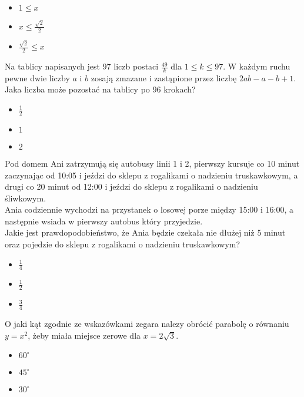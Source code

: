 \documentclass[12pt, a4paper]{article}
\newcommand{\question}[1]{\normalitem \begin{samepage}#1 \end{samepage}}
\newcommand{\cmark}{\textcolor{green}{T}}%
\newcommand{\xmark}{\textcolor{red}{N}}%
\newcommand{\yes}{\rlap{\framebox(15,15)} {\raisebox{2pt}{\large\hspace{-1pt}\cmark}}%
\hspace{3pt}}
\newcommand{\no}{\rlap{\framebox(15,15)} {\raisebox{2pt}{\large\hspace{-1pt}\xmark}}%
\hspace{3pt}}
\begin{document}
\begin{enumerate}
{		\begin{itemize}
			\item [\no]$1 \leq x$
			\item [\no]$x \leq \frac{\sqrt{2}}{2}$
			\item [\yes]$\frac{\sqrt{2}}{2} \leq x$
		\end{itemize}
	}
	
	\question {
		Na tablicy napisanych jest $97$ liczb postaci $\frac{49}{k}$ dla $1 \leq k \leq 97$. W każdym ruchu pewne dwie liczby $a$ i $b$ zosają zmazane i zastąpione przez liczbę $2ab-a-b+1$. Jaka liczba może pozostać na tablicy po $96$ krokach?
		
		\begin{itemize}
			\item [\no]$\frac{1}{2}$
			\item [\yes]$1$
			\item [\no]$2$
		\end{itemize}
	}
	
	\question {
		Pod domem Ani zatrzymują się autobusy linii 1 i 2, pierwszy kursuje co 10 minut zaczynając od 10:05 i jeździ do sklepu z rogalikami o nadzieniu truskawkowym, a drugi co 20 minut od 12:00 i jeździ do sklepu z rogalikami o nadzieniu śliwkowym. \\
		Ania codziennie wychodzi na przystanek o losowej porze między 15:00 i 16:00, a następnie wsiada w pierwszy autobus który przyjedzie. \\
		Jakie jest prawdopodobieństwo, że Ania będzie czekała nie dłużej niż 5 minut oraz pojedzie do sklepu z rogalikami o nadzieniu truskawkowym?
		
		\begin{itemize}
			\item [\no]$\frac{1}{4}$
			\item [\yes]$\frac{1}{2}$
			\item [\no]$\frac{3}{4}$
		\end{itemize}
	}
	
	\question {
		O jaki kąt zgodnie ze wskazówkami zegara nalezy obrócić parabolę o równaniu $y=x^2$, żeby miała miejsce zerowe dla $x=2 \sqrt{3}$.
		
		\begin{itemize}
			\item [\yes]$60^{\circ}$  
			\item [\no]$45^{\circ}$
			\item [\no]$30^{\circ}$
		\end{itemize}
	}
	

\end{enumerate}
\end{document}

